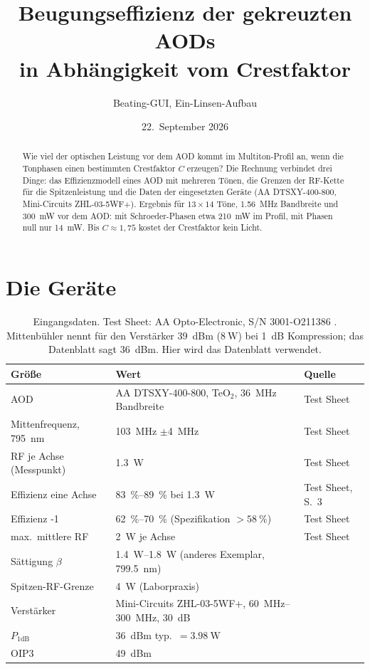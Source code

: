 \documentclass[11pt,a4paper]{article}
\title{Beugungseffizienz der gekreuzten AODs\\ in Abhängigkeit vom Crestfaktor}
\author{Beating-GUI, Ein-Linsen-Aufbau}
\date{22.~September 2026}
\newcommand{\Pone}{P_{\mathrm{1dB}}}
\begin{document}
\maketitle

\begin{abstract}
\noindent
Wie viel der optischen Leistung vor dem AOD kommt im Multiton-Profil an, wenn die
Tonphasen einen bestimmten Crestfaktor $C$ erzeugen? Die Rechnung verbindet drei
Dinge: das Effizienzmodell eines AOD mit mehreren Tönen, die Grenzen der
RF-Kette für die Spitzenleistung und die Daten der eingesetzten Geräte
(AA DTSXY-400-800, Mini-Circuits ZHL-03-5WF+). Ergebnis für
$13\times14$ Töne, \SI{1,56}{\mega\hertz} Bandbreite und \SI{300}{\milli\watt}
vor dem AOD: mit Schroeder-Phasen etwa \SI{210}{\milli\watt} im Profil, mit
Phasen null nur \SI{14}{\milli\watt}. Bis $C\approx1{,}75$ kostet der Crestfaktor
kein Licht.
\end{abstract}

\section{Die Geräte}

\begin{table}[htbp]
\centering\small
\begin{tabularx}{\textwidth}{@{}l>{\raggedright\arraybackslash}Xl@{}}
\toprule
Größe & Wert & Quelle\\
\midrule
AOD & AA DTSXY-400-800, TeO$_2$, \SI{36}{\mega\hertz} Bandbreite & Test Sheet\\
Mittenfrequenz, \SI{795}{\nano\meter} & \SI{103}{\mega\hertz} $\pm$\SI{4}{\mega\hertz} & Test Sheet\\
RF je Achse (Messpunkt) & \SI{1,3}{\watt} & Test Sheet\\
Effizienz eine Achse & \SIrange{83}{89}{\percent} bei \SI{1,3}{\watt} & Test Sheet, S.~3\\
Effizienz \glqq 1-1\grqq{} & \SIrange{62}{70}{\percent} (Spezifikation $>\SI{58}{\percent}$) & Test Sheet\\
max.\ mittlere RF & \SI{2}{\watt} je Achse & Test Sheet\\
Sättigung $\beta$ & \SIrange{1,4}{1,8}{\watt} (anderes Exemplar, \SI{799,5}{\nano\meter}) & \cite[Abb.~3.8]{mittenbuehler}\\
Spitzen-RF-Grenze & \SI{4}{\watt} (Laborpraxis) & \cite[Abschn.~3.3]{mittenbuehler}\\
\midrule
Verstärker & Mini-Circuits ZHL-03-5WF+, \SIrange{60}{300}{\mega\hertz}, \SI{30}{\deci\bel} & \cite{zhl}\\
$\Pone$ & \SI{+36}{dBm} typ.\ $=\SI{3,98}{\watt}$ & \cite{zhl}\\
OIP3 & \SI{+49}{dBm} & \cite{zhl}\\
\bottomrule
\end{tabularx}
\caption{Eingangsdaten. Test Sheet: AA Opto-Electronic, S/N 3001-O211386 \cite{testsheet}. Mittenbühler nennt für den Verstärker \SI{+39}{dBm}
($\SI{8}{\watt}$) bei \SI{1}{\deci\bel} Kompression; das Datenblatt sagt
\SI{+36}{dBm}. Hier wird das Datenblatt verwendet.}
\label{tab:geraete}
\end{table}
\end{document}
